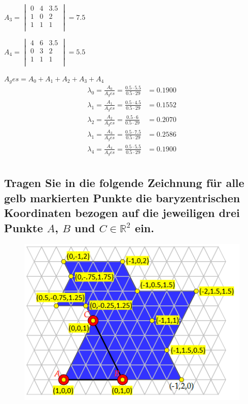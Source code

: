 \documentclass[a4paper,10pt,DIV=14]{article}
\begin{document}
$A_3 = \begin{vmatrix}
			0 & 4 &  3.5 \\
			1 & 0 &  2   \\
			1 & 1 &  1   \\
		\end{vmatrix} = 7.5 $
		\newline
		\newline

$A_4 = \begin{vmatrix}
			4 & 6 &  3.5 \\
			0 & 3 &  2   \\
			1 & 1 &  1   \\
		\end{vmatrix} = 5.5 $
		\newline
		\newline

$A_ges = A_0 + A_1 + A_2 + A_3 + A_4$
\begin{align*}
\lambda_0 = \frac{A_0}{A_ges} = \frac{0.5 \cdot 5.5}{0.5 \cdot 29} & = 0.1900 \\
\lambda_1 = \frac{A_1}{A_ges} =\frac{0.5 \cdot 4.5}{0.5 \cdot 29} & = 0.1552 \\
\lambda_2 = \frac{A_2}{A_ges} =\frac{0.5 \cdot 6}{0.5 \cdot 29}   & = 0.2070 \\
\lambda_1 = \frac{A_3}{A_ges} =\frac{0.5 \cdot 7.5}{0.5 \cdot 29} & = 0.2586 \\
\lambda_4 = \frac{A_4}{A_ges} =\frac{0.5 \cdot 5.5}{0.5 \cdot 29} & = 0.1900 \\
\end{align*}


\subsection{Tragen Sie in die folgende Zeichnung für alle gelb markierten Punkte die baryzentrischen Koordinaten bezogen auf die jeweiligen drei Punkte $A$, $B$ und $C \in \mathbb{R}^2$ ein.}

\begin{figure}[!htbp]
	\centering						
	\includegraphics[width=0.95\linewidth]{map2}
\end{figure}
\end{document}
